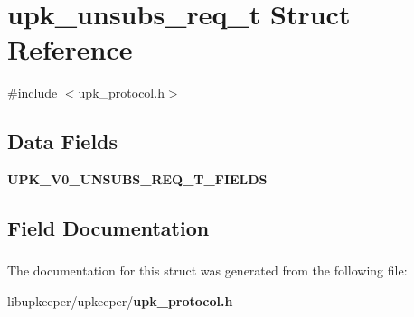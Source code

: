 \section{upk\_\-unsubs\_\-req\_\-t Struct Reference}
\label{structupk__unsubs__req__t}


{\ttfamily \#include $<$upk\_\-protocol.h$>$}

\subsection*{Data Fields}
\begin{DoxyCompactItemize}
\item 
{\bf UPK\_\-V0\_\-UNSUBS\_\-REQ\_\-T\_\-FIELDS}
\end{DoxyCompactItemize}


\subsection{Field Documentation}
\subsubsection[{UPK\_\-V0\_\-UNSUBS\_\-REQ\_\-T\_\-FIELDS}]{}\label{structupk__unsubs__req__t_ab1fcba950b9b2039c1ba94dfdf416807}


The documentation for this struct was generated from the following file:\begin{DoxyCompactItemize}
\item 
libupkeeper/upkeeper/{\bf upk\_\-protocol.h}\end{DoxyCompactItemize}
